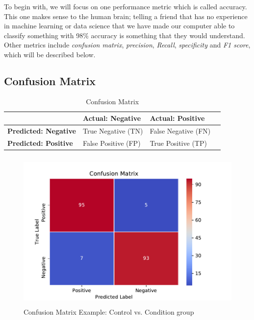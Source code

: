 To begin with, we will focus on one performance metric which is called accuracy. This one makes sense to the human brain; telling a friend that has no experience in machine learning or data science that we have made our computer able to classify something with 98\% accuracy is something that they would understand. Other metrics include \textit{confusion matrix}, \textit{precision}, \textit{Recall}, \textit{specificity} and \textit{F1 score}, which will be described below.

\subsection{Confusion Matrix}

\begin{table}[h]
  \begin{center}
    \begin{tabular}{| l | l | l | l |}
      \hline
                                    & \textbf{Actual: Negative} & \textbf{Actual: Positive} \\ \hline
      \textbf{Predicted: Negative}  & True Negative (TN)        & False Negative (FN)       \\ \hline
      \textbf{Predicted: Positive}  & False Positive (FP)       & True Positive (TP)        \\
      \hline
    \end{tabular}
    \caption{Confusion Matrix}
    \label{table:confusion_matrix}
  \end{center}
\end{table}

\begin{figure}[h]
  \begin{center}
    \includegraphics[height=8cm]{img/conf_matrix.pdf}
    \caption{Confusion Matrix Example: Control vs. Condition group}
    \label{figure:confusion_matrix_bipolar}
  \end{center}
\end{figure}

